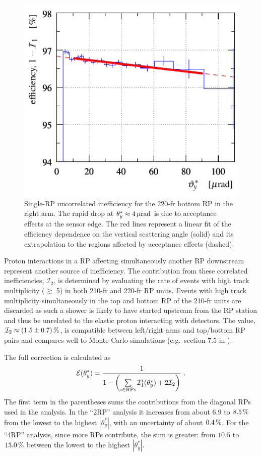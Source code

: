 \begin{figure}
\begin{center}
\includegraphics{fig/eff3outof4_fits.pdf}
\caption{%
Single-RP uncorrelated inefficiency for the 220-fr bottom RP in the right arm. The rapid drop at $\theta_y^* \approx 4\,{\rm \mu rad}$ is due to acceptance effects at the sensor edge. The red lines represent a linear fit of the efficiency dependence on the vertical scattering angle (solid) and its extrapolation to the regions affected by acceptance effects (dashed).
}
\label{fig:eff uncorr}
\end{center}
\end{figure}

Proton interactions in a RP affecting simultaneously another RP downstream represent another source of inefficiency. The contribution from these correlated inefficiencies, $\mathcal{I}_2$, is determined by evaluating the rate of events with high track multiplicity ($\gtrsim$ 5) in both 210-fr and 220-fr RP units. Events with high track multiplicity simultaneously in the top and bottom RP of the 210-fr units are discarded as such a shower is likely to have started upstream from the RP station and thus be unrelated to the elastic proton interacting with detectors. The value, $\mathcal{I}_2 \approx (1.5 \pm 0.7)\,{\rm \%}$, is compatible between left/right arms and top/bottom RP pairs and compares well to Monte-Carlo simulations (e.g.~section 7.5 in \cite{hubert-thesis}).

The full correction is calculated as
\begin{equation}
\label{efficiency}
	\mathcal{E}(\theta_y^*) = {1\over 1 - \left( \sum\limits_{i\in \rm RPs} \mathcal{I}^i_1(\theta_y^*) + 2 \mathcal{I}_2 \right) } \ .
\end{equation}
The first term in the parentheses sums the contributions from the diagonal RPs used in the analysis. In the ``2RP'' analysis it increases from about $6.9$ to $8.5\,{\rm \%}$ from the lowest to the highest $|\theta_y^*|$, with an uncertainty of about $0.4\,{\rm \%}$. For the ``4RP'' analysis, since more RPs contribute, the sum is greater: from $10.5$ to $13.0\,{\rm \%}$ between the lowest to the highest $|\theta_y^*|$.



